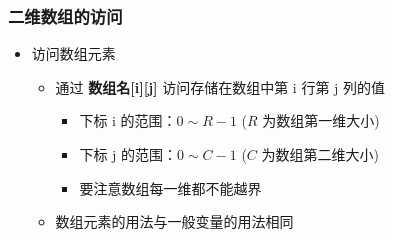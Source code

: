 \begin{frame}[fragile]
    \frametitle{二维数组的访问}

    \begin{itemize}
        \item 访问数组元素

            \begin{itemize}
                \item 通过 \textbf{数组名[i][j]} 访问存储在数组中第 i 行第 j 列的值

                    \begin{itemize}
                        \item 下标 i 的范围：$0 \sim R - 1$ ($R$ 为数组第一维大小)
                        \item 下标 j 的范围：$0 \sim C - 1$ ($C$ 为数组第二维大小)
                        \item 要注意数组每一维都不能越界
                    \end{itemize}

                \item 数组元素的用法与一般变量的用法相同
            \end{itemize}

    \end{itemize}
\end{frame}

